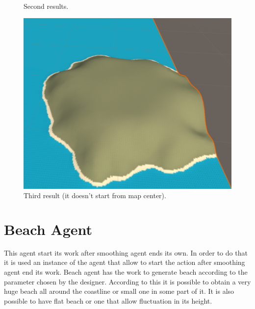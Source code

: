 \documentclass[12pt]{article}
\begin{document}
    \begin{figure}[H]
        \centering     %
        \caption{Second results.}
    \end{figure}

    \begin{figure}[H]
        \centering
        \includegraphics[scale = 0.3]{images/Smoothing agent/256 agenti/4}
        \caption{Third result (it doesn't start from map center).}
    \end{figure}

    \newpage

    \section{Beach Agent}
    This agent start its work after smoothing agent ends its own. In order to do that it is used an instance of the agent that allow to start the action after smoothing agent end its work.
    Beach agent has the work to generate beach according to the parameter chosen by the designer.
    According to this it is possible to obtain a very huge beach all around the coastline or small one in some part of it. It is also possible
    to have flat beach or one that allow fluctuation in its height.
\end{document}
